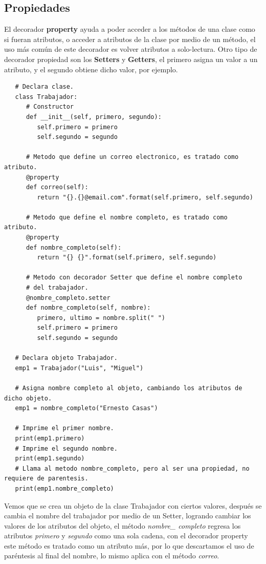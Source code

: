 \subsection{Propiedades}
\hspace{0.55cm}El decorador \textbf{property} ayuda a poder acceder a los métodos de una clase como si fueran atributos, o acceder a atributos de la clase por medio de un método, el uso más común de este decorador es volver atributos a solo-lectura. Otro tipo de decorador propiedad son los \textbf{Setters} y \textbf{Getters}, el primero asigna un valor a un atributo, y el segundo obtiene dicho valor, por ejemplo.
\begin{lstlisting}
   # Declara clase.
   class Trabajador:
      # Constructor
      def __init__(self, primero, segundo):
         self.primero = primero
         self.segundo = segundo
      
      # Metodo que define un correo electronico, es tratado como atributo.
      @property
      def correo(self):
         return "{}.{}@email.com".format(self.primero, self.segundo)
         
      # Metodo que define el nombre completo, es tratado como atributo.
      @property
      def nombre_completo(self):
         return "{} {}".format(self.primero, self.segundo)
         
      # Metodo con decorador Setter que define el nombre completo
      # del trabajador.
      @nombre_completo.setter
      def nombre_completo(self, nombre):
         primero, ultimo = nombre.split(" ")
         self.primero = primero
         self.segundo = segundo
         
   # Declara objeto Trabajador.
   emp1 = Trabajador("Luis", "Miguel")
   
   # Asigna nombre completo al objeto, cambiando los atributos de dicho objeto.
   emp1 = nombre_completo("Ernesto Casas")
   
   # Imprime el primer nombre.
   print(emp1.primero)
   # Imprime el segundo nombre.
   print(emp1.segundo)
   # Llama al metodo nombre_completo, pero al ser una propiedad, no requiere de parentesis.
   print(emp1.nombre_completo)
\end{lstlisting}

Vemos que se crea un objeto de la clase Trabajador con ciertos valores, después se cambia el nombre del trabajador por medio de un Setter, logrando cambiar los valores de los atributos del objeto, el método \textit{nombre\_ completo} regresa los atributos \textit{primero} y \textit{segundo} como una sola cadena, con el decorador property este método es tratado como un atributo más, por lo que descartamos el uso de paréntesis al final del nombre, lo mismo aplica con el método \textit{correo}.



